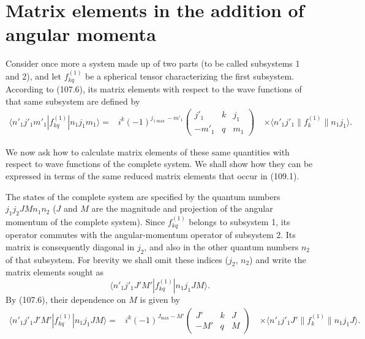 \section{Matrix elements in the addition of angular momenta}

Consider once more a system made up of two parts (to be called subsystems 1 and 2), and let $f_{kq}^{(1)}$ be a spherical tensor characterizing the first subsystem. According to (107.6), its matrix elements with respect to the wave functions of that same subsystem are defined by
\begin{equation}
 \begin{aligned}
 \langle n'_1j'_1m'_1|f_{kq}^{(1)}|n_1j_1m_1\rangle
 ={}&i^k(-1)^{j_{1\max}-m'_1}
 \begin{pmatrix}j'_1&k&j_1\\-m'_1&q&m_1\end{pmatrix}\
 &\times\langle n'_1j'_1\|f_k^{(1)}\|n_1j_1\rangle.
 \end{aligned}
 \tag{109.1}
\end{equation}

We now ask how to calculate matrix elements of these same quantities with respect to wave functions of the complete system. We shall show how they can be expressed in terms of the same reduced matrix elements that occur in (109.1).

The states of the complete system are specified by the quantum numbers $j_1j_2JMn_1n_2$ ($J$ and $M$ are the magnitude and projection of the angular momentum of the complete system). Since $f_{kq}^{(1)}$ belongs to subsystem 1, its operator commutes with the angular-momentum operator of subsystem 2. Its matrix is consequently diagonal in $j_2$, and also in the other quantum numbers $n_2$ of that subsystem. For brevity we shall omit these indices ($j_2$, $n_2$) and write the matrix elements sought as
\[
 \langle n'_1j'_1J'M'|f_{kq}^{(1)}|n_1j_1JM\rangle.
\]
By (107.6), their dependence on $M$ is given by
\begin{equation}
 \begin{aligned}
 \langle n'_1j'_1J'M'|f_{kq}^{(1)}|n_1j_1JM\rangle
 ={}&i^k(-1)^{J_{\max}-M'}
 \begin{pmatrix}J'&k&J\\-M'&q&M\end{pmatrix}\
 &\times\langle n'_1j'_1J'\|f_k^{(1)}\|n_1j_1J\rangle.
 \end{aligned}
 \tag{109.2}
\end{equation}


